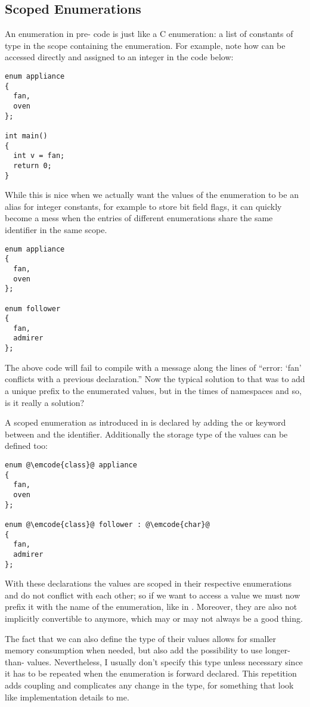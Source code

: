 \subsection{Scoped Enumerations}

\problemtitle

An enumeration in pre- code is just like a C enumeration: a list
of constants of type  in the scope containing the
enumeration. For example, note how  can be
accessed directly and assigned to an integer in the code below:

\begin{lstlisting}
enum appliance
{
  fan,
  oven
};

int main()
{
  int v = fan;
  return 0;
}
\end{lstlisting}

While this is nice when we actually want the values of the
enumeration to be an alias for integer constants, for example to store
bit field flags, it can quickly become a mess when the entries of
different enumerations share the same identifier in the same scope.

\begin{lstlisting}
enum appliance
{
  fan,
  oven
};

enum follower
{
  fan,
  admirer
};
\end{lstlisting}

The above code will fail to compile with a message along the lines of
``error: ‘fan’ conflicts with a previous declaration.'' Now the
typical solution to that was to add a unique prefix to the enumerated
values, but in the times of namespaces and so, is it really a solution?

\solutiontitle

A scoped enumeration as introduced in  is declared by adding the
 or  keyword between  and the
identifier. Additionally the storage type of the values can be defined
too:

\begin{lstlisting}
enum @\emcode{class}@ appliance
{
  fan,
  oven
};

enum @\emcode{class}@ follower : @\emcode{char}@
{
  fan,
  admirer
};
\end{lstlisting}

With these declarations the values are scoped in their respective
enumerations and do not conflict with each other; so if we want to
access a value we must now prefix it with the name of the enumeration,
like in . Moreover, they are also not implicitly
convertible to  anymore, which may or may not always be a
good thing.

The fact that we can also define the type of their values allows for
smaller memory consumption when needed, but also add the possibility
to use longer-than- values. Nevertheless, I usually don't
specify this type unless necessary since it has to be repeated when
the enumeration is forward declared. This repetition adds coupling and
complicates any change in the type, for something that look like
implementation details to me.

